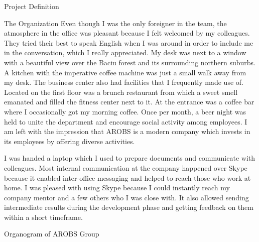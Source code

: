\documentclass{matthijs}
\begin{document}
\begin{hoofdstuk}{Project Definition}
\begin{paragraaf}{The Organization}
			Even though I was the only foreigner in the team, the atmosphere in the office was pleasant because I felt welcomed by my colleagues.
			They tried their best to speak English when I was around in order to include me in the conversation, which I really appreciated.
			My desk was next to a window with a beautiful view over the Baciu forest and its surrounding northern suburbs.
			A kitchen with the imperative coffee machine was just a small walk away from my desk.
			The business center also had facilities that I frequently made use of.
			Located on the first floor was a brunch restaurant from which a sweet smell emanated and filled the fitness center next to it.
			At the entrance was a coffee bar where I occasionally got my morning coffee.
			Once per month, a beer night was held to unite the department and encourage social activity among employees.
			I am left with the impression that AROBS is a modern company which invests in its employees by offering diverse activities.

			\noindent I was handed a laptop which I used to prepare documents and communicate with colleagues.
			Most internal communication at the company happened over Skype because it enabled inter-office messaging and helped to reach those who work at home.
			I was pleased with using Skype because I could instantly reach my company mentor and a few others who I was close with.
			It also allowed sending intermediate results during the development phase and getting feedback on them within a short timeframe.

			\vspace{1ex}
			\begin{figuur}{Organogram of AROBS Group}
				\centerline{
					}
\end{figuur}
\end{paragraaf}
\end{hoofdstuk}
\end{document}
